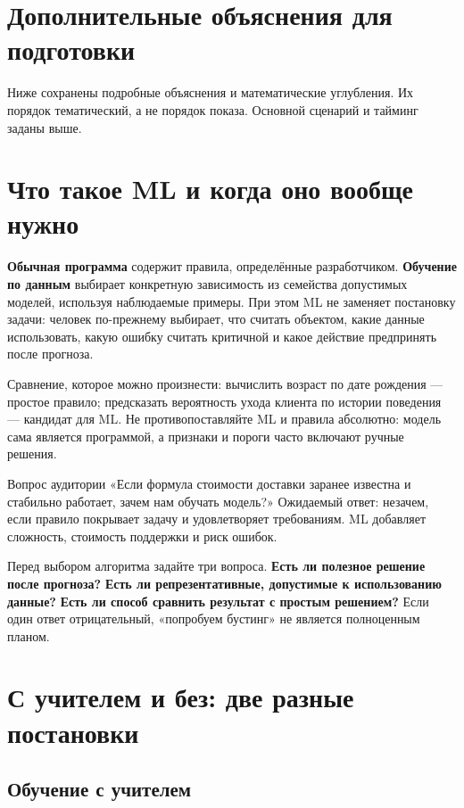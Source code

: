 \documentclass[11pt,a4paper]{article}
\newcommand{\term}[1]{\textbf{\color{navy}#1}}
\begin{document}
\newpage
\appendix
\section{Дополнительные объяснения для подготовки}
Ниже сохранены подробные объяснения и математические углубления. Их порядок тематический, а не порядок показа. Основной сценарий и тайминг заданы выше.
\section{Что такое ML и когда оно вообще нужно}



\term{Обычная программа} содержит правила, определённые разработчиком. \term{Обучение по данным} выбирает конкретную зависимость из семейства допустимых моделей, используя наблюдаемые примеры. При этом ML не заменяет постановку задачи: человек по-прежнему выбирает, что считать объектом, какие данные использовать, какую ошибку считать критичной и какое действие предпринять после прогноза.

Сравнение, которое можно произнести: вычислить возраст по дате рождения --- простое правило; предсказать вероятность ухода клиента по истории поведения --- кандидат для ML. Не противопоставляйте ML и правила абсолютно: модель сама является программой, а признаки и пороги часто включают ручные решения.

\begin{saybox}{Вопрос аудитории}
«Если формула стоимости доставки заранее известна и стабильно работает, зачем нам обучать модель?» Ожидаемый ответ: незачем, если правило покрывает задачу и удовлетворяет требованиям. ML добавляет сложность, стоимость поддержки и риск ошибок.
\end{saybox}

Перед выбором алгоритма задайте три вопроса. \textbf{Есть ли полезное решение после прогноза?} \textbf{Есть ли репрезентативные, допустимые к использованию данные?} \textbf{Есть ли способ сравнить результат с простым решением?} Если один ответ отрицательный, «попробуем бустинг» не является полноценным планом.

\section{С учителем и без: две разные постановки}



\subsection{Обучение с учителем}
\end{document}

